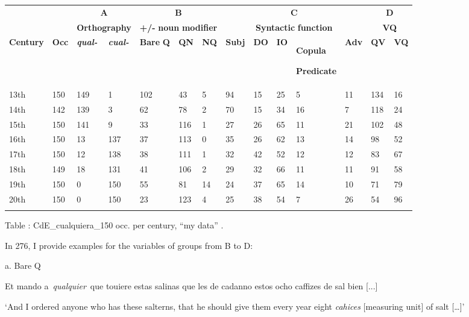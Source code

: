 \documentclass[output=paper]{langscibook}
\begin{document}
\begin{tabularx}{\textwidth}{XXXXXXXXXXXXXX}

\lsptoprule
\multicolumn{1}{c}{} &  & \multicolumn{2}{c}{ \textbf{A}} & \multicolumn{3}{c}{ \textbf{B}} & \multicolumn{5}{c}{ \textbf{C}} & \multicolumn{2}{c}{ \textbf{D}}\\
\multicolumn{1}{c}{} &  & \multicolumn{2}{c}{ \textbf{Orthography}} & \multicolumn{3}{c}{ \textbf{+/-} \textbf{noun} \textbf{modifier}} & \multicolumn{5}{c}{ \textbf{Syntactic} \textbf{function}} & \multicolumn{2}{c}{ \textbf{VQ}}\\
 \textbf{Century} & \textbf{Occ} & \textbf{\textit{qual-}} & \textbf{\textit{cual-}} & \textbf{Bare} \textbf{Q} & \textbf{QN} & \textbf{NQ} & \textbf{Subj} & \textbf{DO} & \textbf{IO} & { \textbf{Copula}}

 \textbf{Predicate} & \textbf{Adv} & \textbf{QV} & \textbf{VQ}\\
 13th & 150 & 149 & 1 & 102 & 43 & 5 & 94 & 15 & 25 & 5 & 11 & 134 & 16\\
 14th & 142 & 139 & 3 & 62 & 78 & 2 & 70 & 15 & 34 & 16 & 7 & 118 & 24\\
 15th & 150 & 141 & 9 & 33 & 116 & 1 & 27 & 26 & 65 & 11 & 21 & 102 & 48\\
 16th & 150 & 13 & 137 & 37 & 113 & 0 & 35 & 26 & 62 & 13 & 14 & 98 & 52\\
 17th & 150 & 12 & 138 & 38 & 111 & 1 & 32 & 42 & 52 & 12 & 12 & 83 & 67\\
 18th & 149 & 18 & 131 & 41 & 106 & 2 & 29 & 32 & 66 & 11 & 11 & 91 & 58\\
 19th & 150 & 0 & 150 & 55 & 81 & 14 & 24 & 37 & 65 & 14 & 10 & 71 & 79\\
 20th & 150 & 0 & 150 & 23 & 123 & 4 & 25 & 38 & 54 & 7 & 26 & 54 & 96\\
\lspbottomrule
\end{tabularx}
Table : CdE\_cualquiera\_150 occ. per century, “my data” .

In 276, I provide examples for the variables of groups from B to D:

  a.  Bare Q

    Et mando a~\textit{qualquier}~que touiere estas salinas que les de cadanno estos ocho caffizes de sal bien [...] 

    ‘And I ordered anyone who has these salterns, that he should give them every year eight \textit{cahices} [measuring unit] of salt […]’
\end{document}
